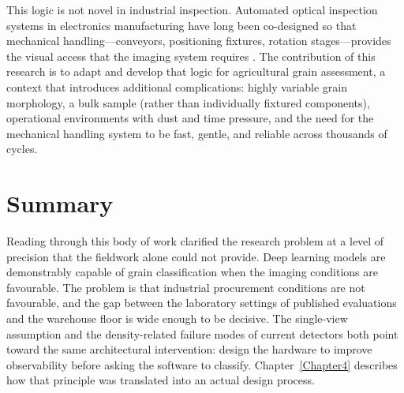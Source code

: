 This logic is not novel in industrial inspection. Automated optical inspection systems in electronics manufacturing have long been co-designed so that mechanical handling---conveyors, positioning fixtures, rotation stages---provides the visual access that the imaging system requires \cite{Newman1995}. The contribution of this research is to adapt and develop that logic for agricultural grain assessment, a context that introduces additional complications: highly variable grain morphology, a bulk sample (rather than individually fixtured components), operational environments with dust and time pressure, and the need for the mechanical handling system to be fast, gentle, and reliable across thousands of cycles.

\section{Summary}

Reading through this body of work clarified the research problem at a level of precision that the fieldwork alone could not provide. Deep learning models are demonstrably capable of grain classification when the imaging conditions are favourable. The problem is that industrial procurement conditions are not favourable, and the gap between the laboratory settings of published evaluations and the warehouse floor is wide enough to be decisive. The single-view assumption and the density-related failure modes of current detectors both point toward the same architectural intervention: design the hardware to improve observability before asking the software to classify. Chapter~\ref{Chapter4} describes how that principle was translated into an actual design process.
